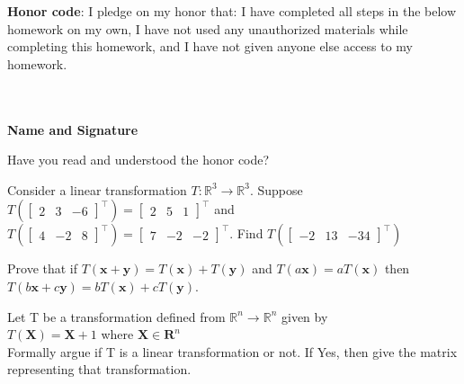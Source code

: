 \documentclass[solution,addpoints,12pt]{exam}
\begin{document}
\noindent \textbf{Honor code}: I pledge on my honor that: I have completed all steps in the below homework on my own, I have not used any unauthorized materials while completing this homework, and I have not given anyone else access to my homework.
\\~\\~\\
\begin{flushright}
\textbf{Name and Signature}

\end{flushright}


\begin{questions}

\question[1] Have you read and understood the honor code?
\begin{solution}

\end{solution}


\question[1] 
Consider a linear transformation $T: \mathbb{R}^3 \rightarrow \mathbb{R}^3$. Suppose $T (\begin{bmatrix}2 & 3& -6\end{bmatrix}^\top) = \begin{bmatrix}2 & 5& 1\end{bmatrix}^\top$ and $T (\begin{bmatrix}4 & -2& 8\end{bmatrix}^\top) = \begin{bmatrix}7 & -2& -2\end{bmatrix}^\top$. Find $T (\begin{bmatrix}-2 & 13& -34\end{bmatrix}^\top)$
\begin{solution}
\end{solution}

\question[1] Prove that if $T(\mathbf{x} + \mathbf{y}) = T(\mathbf{x}) + T(\mathbf{y})$ and $T(a\mathbf{x}) = a T(\mathbf{x})$ then $T(b\mathbf{x} + c\mathbf{y}) = bT(\mathbf{x}) + cT(\mathbf{y})$.
\begin{solution}
\end{solution}

\question[2] 
Let T be a transformation defined from $\mathbb{R}^n \rightarrow \mathbb{R}^n$ given by \\
$T(\mathbf{X}) = \mathbf{X} + 1$ where $\mathbf{X} \in \mathbf{R}^n$ \\
Formally argue if T is a linear transformation or not. If Yes, then give the matrix representing that transformation.  
\begin{solution}
\end{solution}


\end{questions}
\end{document}
